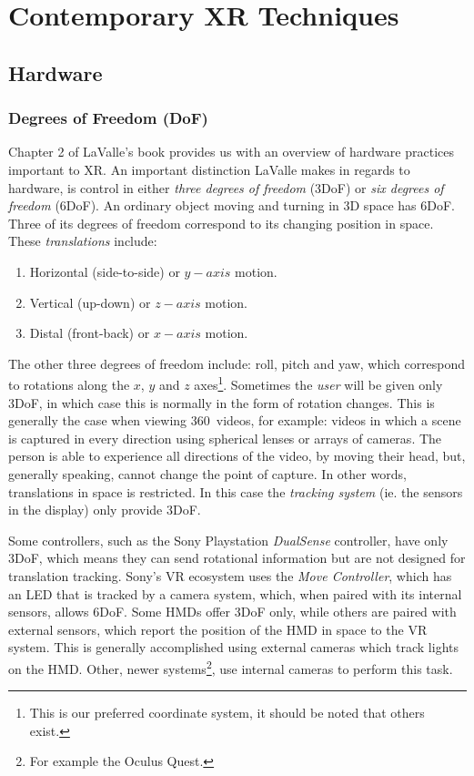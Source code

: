 \section{Contemporary XR Techniques}

\subsection{Hardware}

\subsubsection{Degrees of Freedom (DoF)}

Chapter 2 of LaValle's book \cite{lavalle2016virtual} provides us with an overview of hardware practices important to XR. An important distinction LaValle makes in regards to hardware, is control in either \textit{three degrees of freedom} (3DoF) or \textit{six degrees of freedom} (6DoF). An ordinary object moving and turning in 3D space has 6DoF. Three of its degrees of freedom correspond to its changing position in space. These \textit{translations} include: 

\begin{enumerate}
    \item Horizontal (side-to-side) or $y-axis$ motion.
    \item Vertical (up-down) or $z-axis$ motion.
    \item Distal (front-back) or $x-axis$ motion.
\end{enumerate}

The other three degrees of freedom include: roll, pitch and yaw, which correspond to rotations along the $x$, $y$ and $z$ axes\footnote{This is our preferred coordinate system, it should be noted that others exist.}. Sometimes the \textit{user} will be given only 3DoF, in which case this is normally in the form of rotation changes. This is generally the case when viewing 360\textdegree \ videos, for example: videos in which a scene is captured in every direction using spherical lenses or arrays of cameras. The person is able to experience all directions of the video, by moving their head, but, generally speaking, cannot change the point of capture. In other words, translations in space is restricted. In this case the \textit{tracking system} (ie. the sensors in the display) only provide 3DoF.

Some controllers, such as the Sony Playstation \textit{DualSense} controller, have only 3DoF, which means they can send rotational information but are not designed for translation tracking. Sony's VR ecosystem uses the \textit{Move Controller}, which has an LED that is tracked by a camera system, which, when paired with its internal sensors, allows 6DoF. Some HMDs offer 3DoF only, while others are paired with external sensors, which report the position of the HMD in space to the VR system. This is generally accomplished using external cameras which track lights on the HMD. Other, newer systems\footnote{For example the Oculus Quest.}, use internal cameras to perform this task. 

